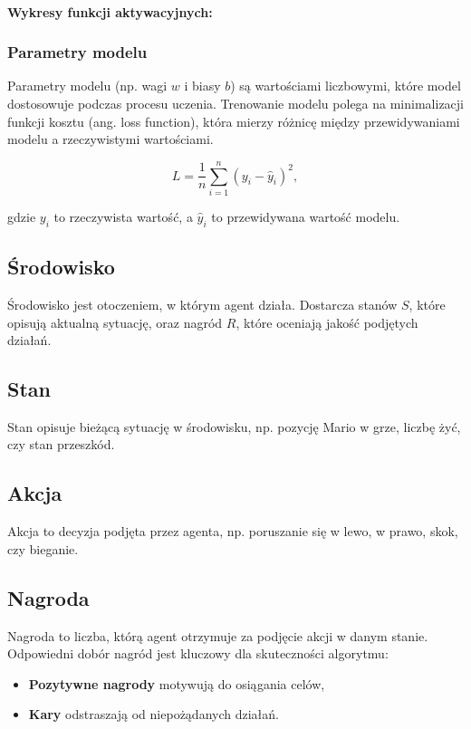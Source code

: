 \paragraph{Wykresy funkcji aktywacyjnych:}

\subsubsection{Parametry modelu}

Parametry modelu (np. wagi \(w\) i biasy \(b\)) są wartościami liczbowymi, które model dostosowuje podczas procesu uczenia. Trenowanie modelu polega na minimalizacji funkcji kosztu (ang. loss function), która mierzy różnicę między przewidywaniami modelu a rzeczywistymi wartościami.

\[
	L = \frac{1}{n} \sum_{i=1}^{n} (y_i - \hat{y}_i)^2,
\]

gdzie \(y_i\) to rzeczywista wartość, a \(\hat{y}_i\) to przewidywana wartość modelu.

\subsection{Środowisko}
Środowisko jest otoczeniem, w którym agent działa. Dostarcza stanów \( S \), które opisują aktualną sytuację, oraz nagród \( R \), które oceniają jakość podjętych działań.

\subsection{Stan}
Stan opisuje bieżącą sytuację w środowisku, np. pozycję Mario w grze, liczbę żyć, czy stan przeszkód.

\subsection{Akcja}
Akcja to decyzja podjęta przez agenta, np. poruszanie się w lewo, w prawo, skok, czy bieganie.

\subsection{Nagroda}
Nagroda to liczba, którą agent otrzymuje za podjęcie akcji w danym stanie. Odpowiedni dobór nagród jest kluczowy dla skuteczności algorytmu:
\begin{itemize}
	\item \textbf{Pozytywne nagrody} motywują do osiągania celów,
	\item \textbf{Kary} odstraszają od niepożądanych działań.
\end{itemize}

